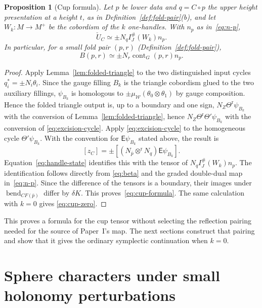 \documentclass[11pt]{amsart}
\newtheorem{proposition}[theorem]{Proposition}
\theoremstyle{definition}
\theoremstyle{remark}
\theoremstyle{plain}
\numberwithin{equation}{section}
\newcommand{\CF}{\mathit{CF}}
\newcommand{\IG}{I^{\#}_{J}}
\newcommand{\cont}{\operatorname{cont}}
\begin{document}
\begin{proposition}[Cup formula]\label{prop:cup-formula}
Let $p$ be lower data and $q=C\circ p$ the upper height presentation at
a height $t$, as in Definition~\ref{def:fold-pair}(b), and let
$W_k:M\to M^+$ be the cobordism of the $k$ one-handles. With $n_p$ as
in~\eqref{eq:n-p},
\begin{equation}\label{eq:cup-formula}
 \check U_C\simeq\pm N_q\IG(W_k)n_p.
\end{equation}
In particular, for a small fold pair
$(p,r)$ (Definition~\ref{def:fold-pair}),
\begin{equation}\label{eq:cup-zero}
 B(p,r)\simeq\pm N_r\cont_G(p,r)n_p.
\end{equation}
\end{proposition}
\begin{proof}
Apply Lemma~\ref{lem:folded-triangle} to
the two distinguished input cycles
$q_i^*=\pm N_i\theta_i$. Since the gauge
filling $B_k$ is the triangle cobordism
glued to the two auxiliary fillings,
$\psi_{B_k}$ is homologous to
$\pm\mu_{\mathscr W}(\theta_0\otimes\theta_1)$
by gauge composition. Hence the
folded triangle output is, up to a
boundary and one sign,
$N_Z\Theta^{\mathrm r}\psi_{B_k}$ with the
conversion of Lemma~\ref{lem:folded-triangle},
hence $N_Z\Theta^{\mathrm r}\Theta'\psi_{B_k}$
with the conversion of \eqref{eq:excision-cycle}.
Apply \eqref{eq:excision-cycle} to the
homogeneous cycle $\Theta'\psi_{B_k}$. With the
convention for $\mathsf E\psi_{B_k}$ stated
above, the result is
\[
 [z_C]=\pm[(N_{\bar p}\otimes^{\mathrm r} N_q)
                          \mathsf E\psi_{B_k}].
\]
Equation~\eqref{eq:handle-state} identifies
this with the tensor of $N_q\IG(W_k)n_p$.
The identification follows directly from
\eqref{eq:beta} and the graded double-dual
map in~\eqref{eq:n-p}. Since the difference
of the tensors is a boundary, their images
under $\operatorname{bend}_{\CF(\bar p)}$ differ by $\delta K$.
This proves~\eqref{eq:cup-formula}. The same
calculation with $k=0$ gives
\eqref{eq:cup-zero}.
\end{proof}

This proves a formula for the cup tensor
without selecting the reflection pairing
needed for the source of Paper~I's map.
The next sections construct that pairing
and show that it gives the ordinary
symplectic continuation when $k=0$.

\section{Sphere characters under small holonomy perturbations}
\label{sec:characters}
\end{document}
